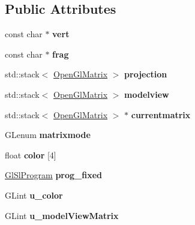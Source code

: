 \subsection*{Public Attributes}
\begin{DoxyCompactItemize}
\item 
const char $\ast$ {\bfseries vert}
\item 
const char $\ast$ {\bfseries frag}
\item 
std\+::stack$<$ \hyperlink{structpangolin_1_1_open_gl_matrix}{Open\+Gl\+Matrix} $>$ {\bfseries projection}\hypertarget{classpangolin_1_1_gl_engine_a73fdbb1caced9e65f3110d182b8f2b89}{}\label{classpangolin_1_1_gl_engine_a73fdbb1caced9e65f3110d182b8f2b89}

\item 
std\+::stack$<$ \hyperlink{structpangolin_1_1_open_gl_matrix}{Open\+Gl\+Matrix} $>$ {\bfseries modelview}\hypertarget{classpangolin_1_1_gl_engine_a4405297088d532ad9b142a64bcb060dc}{}\label{classpangolin_1_1_gl_engine_a4405297088d532ad9b142a64bcb060dc}

\item 
std\+::stack$<$ \hyperlink{structpangolin_1_1_open_gl_matrix}{Open\+Gl\+Matrix} $>$ $\ast$ {\bfseries currentmatrix}\hypertarget{classpangolin_1_1_gl_engine_ae980b81dc9773851f36f7804a6bf922a}{}\label{classpangolin_1_1_gl_engine_ae980b81dc9773851f36f7804a6bf922a}

\item 
G\+Lenum {\bfseries matrixmode}\hypertarget{classpangolin_1_1_gl_engine_a6880f2b51d83d1e5dd3d6f557d7aa6c8}{}\label{classpangolin_1_1_gl_engine_a6880f2b51d83d1e5dd3d6f557d7aa6c8}

\item 
float {\bfseries color} \mbox{[}4\mbox{]}\hypertarget{classpangolin_1_1_gl_engine_ab7a12f10e136807a67d130b271fa7e21}{}\label{classpangolin_1_1_gl_engine_ab7a12f10e136807a67d130b271fa7e21}

\item 
\hyperlink{classpangolin_1_1_gl_sl_program}{Gl\+Sl\+Program} {\bfseries prog\+\_\+fixed}\hypertarget{classpangolin_1_1_gl_engine_aecc159f5b9057fbb26c404527e2198ce}{}\label{classpangolin_1_1_gl_engine_aecc159f5b9057fbb26c404527e2198ce}

\item 
G\+Lint {\bfseries u\+\_\+color}\hypertarget{classpangolin_1_1_gl_engine_a1c846bf1c9b239f3d7a5a3a78983869c}{}\label{classpangolin_1_1_gl_engine_a1c846bf1c9b239f3d7a5a3a78983869c}

\item 
G\+Lint {\bfseries u\+\_\+model\+View\+Matrix}\hypertarget{classpangolin_1_1_gl_engine_a0b153194c12897ce7c93367ca317f7b9}{}\label{classpangolin_1_1_gl_engine_a0b153194c12897ce7c93367ca317f7b9}


\end{DoxyCompactItemize}
